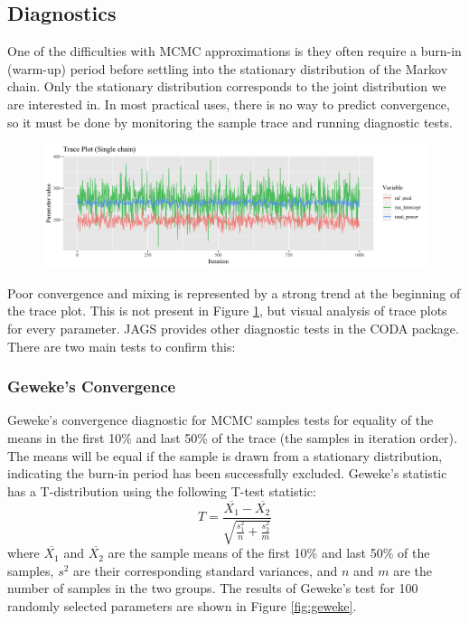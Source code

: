 \documentclass[a4paper, 12pt]{article}
\begin{document}
\subsection{Diagnostics}
One of the difficulties with MCMC approximations is they often require a burn-in (warm-up) period before settling into the stationary distribution of the Markov chain. Only the stationary distribution corresponds to the joint distribution we are interested in. In most practical uses, there is no way to predict convergence, so it must be done by monitoring the sample trace and running diagnostic tests.

\begin{figure}
\centering
  \includegraphics[width=\linewidth]{media/trace_plot}
  \label{fig:trace_plot}
\end{figure}

Poor convergence and mixing is represented by a strong trend at the beginning of the trace plot. This is not present in Figure \ref{fig:trace_plot}, but visual analysis of trace plots for every parameter.
JAGS provides other diagnostic tests in the CODA package. There are two main tests to confirm this:

\subsubsection{Geweke's Convergence}
Geweke's convergence diagnostic for MCMC samples tests for equality of the means in the first 10\% and last 50\% of the trace (the samples in iteration order). The means will be equal if the sample is drawn from a stationary distribution, indicating the burn-in period has been successfully excluded. Geweke's statistic has a T-distribution using the following T-test statistic:
\begin{equation}
T=\frac{\overline{X_1}-\overline{X_2}}{\sqrt{\frac{s_1^2}{n} + \frac{s_2^2}{m}}}
\end{equation}
where $\overline{X_1}$ and $\overline{X_2}$ are the sample means of the first 10\% and last 50\% of the samples, $s^2$ are their corresponding standard variances, and $n$ and $m$ are the number of samples in the two groups. The results of Geweke's test for 100 randomly selected parameters are shown in Figure \ref{fig:geweke}.
\end{document}

